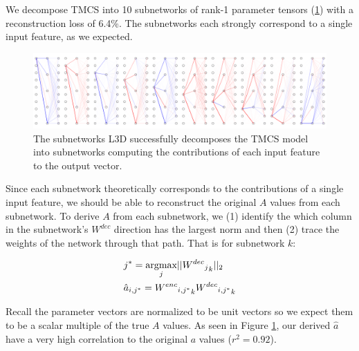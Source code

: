 \documentclass{article}
\theoremstyle{plain}
\theoremstyle{definition}
\theoremstyle{remark}
\begin{document}
We decompose TMCS into 10 subnetworks of rank-1 parameter tensors (\ref{fig:5_circuit_superposition_decomposition}) with a reconstruction loss of 6.4\%. The subnetworks each strongly correspond to a single input feature, as we expected.

\begin{figure}[htbp]
    \centerline{\includegraphics[width=\textwidth]{../figures/5_circuit_superposition_decomposition.pdf}}
    \centering
    \caption{The subnetworks L3D successfully decomposes the TMCS model into subnetworks computing the contributions of each input feature to the output vector.}\label{fig:5_circuit_superposition_decomposition}
\end{figure}


Since each subnetwork theoretically corresponds to the contributions of a single input feature, we should be able to reconstruct the original $A$ values from each subnetwork. To derive $A$ from each subnetwork, we (1) identify the which column in the subnetwork's $W^{dec}$ direction has the largest norm and then (2) trace the weights of the network through that path. That is for subnetwork $k$: 

\begin{align}
    &j^* = \underset{j}{\text{argmax}} ||{{{W^{dec}}_j}_k}||_2 \\
    &\hat{a}_{i,j^*} = {{{W^{enc}}_{i,j^*}}}_k {{W^{dec}}_{i,j^*}}_k \notag
\end{align}

Recall the parameter vectors are normalized to be unit vectors so we expect them to be a scalar multiple of the true $A$ values. As seen in Figure \ref{fig:5_circuit_superposition_decomposition}, our derived $\hat{a}$ have a very high correlation to the original $a$ values ($r^2 = 0.92$).
\end{document}
